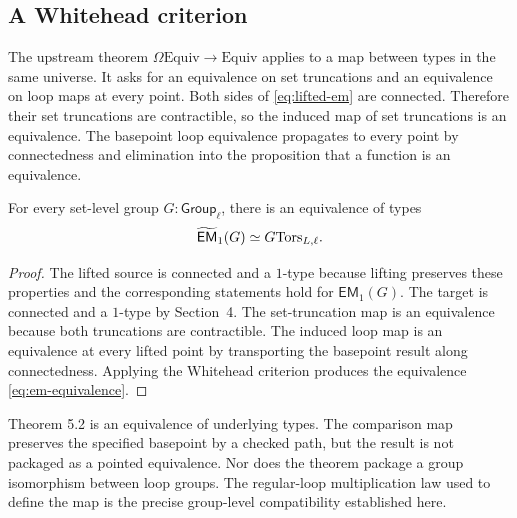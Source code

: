\subsection{A Whitehead criterion}
The upstream theorem $\Omega\mathrm{Equiv}\to\mathrm{Equiv}$ applies to a map between types in the same universe. It asks for an equivalence on set truncations and an equivalence on loop maps at every point. Both sides of \eqref{eq:lifted-em} are connected. Therefore their set truncations are contractible, so the induced map of set truncations is an equivalence. The basepoint loop equivalence propagates to every point by connectedness and elimination into the proposition that a function is an equivalence.

\begin{theorem}
\label{thm:em-torsor}
For every set-level group $G:\mathsf{Group}_\ell$, there is an equivalence of types
\begin{equation}
\widetilde{\mathsf{EM}}_1(G)\simeq G\mathrm{Tors}_{L,\ell}.
\label{eq:em-equivalence}
\end{equation}
\end{theorem}
\begin{proof}
The lifted source is connected and a $1$-type because lifting preserves these properties and the corresponding statements hold for $\mathsf{EM}_1(G)$. The target is connected and a $1$-type by Section~4. The set-truncation map is an equivalence because both truncations are contractible. The induced loop map is an equivalence at every lifted point by transporting the basepoint result along connectedness. Applying the Whitehead criterion produces the equivalence \eqref{eq:em-equivalence}.
\end{proof}


\begin{warning}
Theorem 5.2 is an equivalence of underlying types. The comparison map preserves the specified basepoint by a checked path, but the result is not packaged as a pointed equivalence. Nor does the theorem package a group isomorphism between loop groups. The regular-loop multiplication law used to define the map is the precise group-level compatibility established here.
\end{warning}
